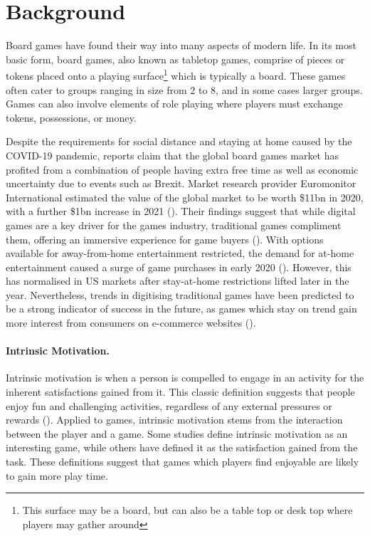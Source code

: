 \documentclass[12pt]{article}
\begin{document}

\section{Background}


Board games have found their way into many aspects of modern life. 
In its most basic form, board games, also known as tabletop games, comprise of pieces or tokens placed onto a playing surface\footnote{This surface may be a board, but can also be a table top or desk top where players may gather around} which is typically a board. 
These games often cater to groups ranging in size from 2 to 8, and in some cases larger groups. 
Games can also involve elements of role playing where players must exchange tokens, possessions, or money. 

Despite the requirements for social distance and staying at home caused by the COVID-19 pandemic, reports claim that the global board games market has profited from a combination of people having extra free time as well as economic uncertainty due to events such as Brexit. 
Market research provider Euromonitor International estimated the value of the global market to be worth \$11bn in 2020, with a further \$1bn increase in 2021 (\cite{jarvis2021}).
Their findings suggest that while digital games are a key driver for the games industry, traditional games compliment them, offering an immersive experience for game buyers (\cite{euromonitor2021world}).
With options available for away-from-home entertainment restricted, the demand for at-home entertainment caused a surge of game purchases in early 2020 (\cite{euromonitor2020covid}). However, this has normalised in US markets after stay-at-home restrictions lifted later in the year. 
Nevertheless, trends in digitising traditional games have been predicted to be a strong indicator of success in the future, as games which stay on trend gain more interest from consumers on e-commerce websites (\cite{euromonitor2021uk, euromonitor2021us}). 

\paragraph{Intrinsic Motivation.} %
Intrinsic motivation is when a person is compelled to engage in an activity for the inherent satisfactions gained from it. 
This classic definition suggests that people enjoy fun and challenging activities, regardless of any external pressures or rewards (\cite{ryan2000intrinsic}).
Applied to games, intrinsic motivation stems from the interaction between the player and a game. 
Some studies define intrinsic motivation as an interesting game, while others have defined it as the satisfaction gained from the task. 
These definitions suggest that games which players find enjoyable are likely to gain more play time.
\end{document}
